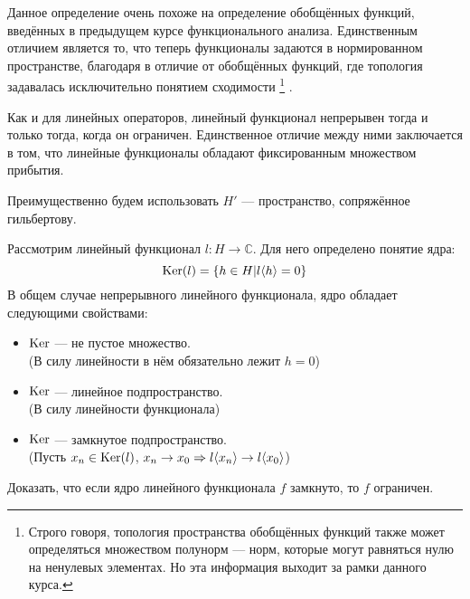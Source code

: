 \documentclass[12pt]{article}
\begin{document}
	Данное определение очень похоже на определение обобщённых функций, введённых в предыдущем курсе функционального анализа. 
	Единственным отличием является то, что теперь функционалы задаются в нормированном пространстве, благодаря в отличие от
	обобщённых функций, где топология задавалась исключительно понятием сходимости
	\footnote
	{
		Строго говоря, топология пространства обобщённых функций также может определяться множеством 
		полунорм --- норм, которые могут равняться нулю на ненулевых элементах. Но эта информация выходит
		за рамки данного курса.
	}
	.
	
	Как и для линейных операторов, линейный функционал непрерывен тогда и только тогда, когда он ограничен. Единственное отличие
	между ними заключается в том, что линейные функционалы обладают фиксированным множеством прибытия.
	
	Преимущественно будем использовать $H'$ --- пространство, сопряжённое гильбертову.
	
	Рассмотрим линейный функционал $l: H \rightarrow \mathbb{C}$. Для него определено понятие ядра:
	$$\text{Ker}(l) = \{ h \in H | l \langle h \rangle = 0\}$$
	В общем случае непрерывного линейного функционала, ядро обладает следующими свойствами:
	\begin{itemize}
		\item $\text{Ker}$ --- не пустое множество. \\
		(В силу линейности в нём обязательно лежит $h = 0$)
		\item $\text{Ker}$ --- линейное подпространство. \\
		(В силу линейности функционала)
		\item $\text{Ker}$ --- замкнутое подпространство. \\
		(Пусть $x_n \in \text{Ker}(l)$, $x_n \rightarrow x_0 \Rightarrow l\langle x_n \rangle \rightarrow l\langle x_0 \rangle$)
	\end{itemize}
	
	\exc Доказать, что если ядро линейного функционала $f$ замкнуто, то $f$ ограничен.
	
\end{document}
